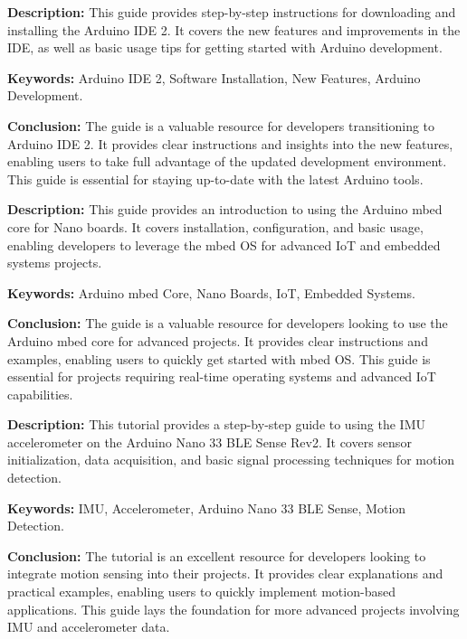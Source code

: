{
	\textbf{Description:} This guide provides step-by-step instructions for downloading and installing the Arduino IDE 2. It covers the new features and improvements in the IDE, as well as basic usage tips for getting started with Arduino development.
	\newline
	
	\textbf{Keywords:} Arduino IDE 2, Software Installation, New Features, Arduino Development.
	
	\newpage
	\textbf{Conclusion:} The guide is a valuable resource for developers transitioning to Arduino IDE 2. It provides clear instructions and insights into the new features, enabling users to take full advantage of the updated development environment. This guide is essential for staying up-to-date with the latest Arduino tools\cite{Arduino:2024f}.
}
{
	\textbf{Description:} This guide provides an introduction to using the Arduino mbed core for Nano boards. It covers installation, configuration, and basic usage, enabling developers to leverage the mbed OS for advanced IoT and embedded systems projects.
	\newline
	
	\textbf{Keywords:} Arduino mbed Core, Nano Boards, IoT, Embedded Systems.
	
	\newpage
	\textbf{Conclusion:} The guide is a valuable resource for developers looking to use the Arduino mbed core for advanced projects. It provides clear instructions and examples, enabling users to quickly get started with mbed OS. This guide is essential for projects requiring real-time operating systems and advanced IoT capabilities\cite{Arduino:2024g}.
}

{
	\textbf{Description:} This tutorial provides a step-by-step guide to using the IMU accelerometer on the Arduino Nano 33 BLE Sense Rev2. It covers sensor initialization, data acquisition, and basic signal processing techniques for motion detection.
	\newline
	
	\textbf{Keywords:} IMU, Accelerometer, Arduino Nano 33 BLE Sense, Motion Detection.
	
	\newpage
	\textbf{Conclusion:} The tutorial is an excellent resource for developers looking to integrate motion sensing into their projects. It provides clear explanations and practical examples, enabling users to quickly implement motion-based applications. This guide lays the foundation for more advanced projects involving IMU and accelerometer data\cite{Arduino:2024h}.
}

